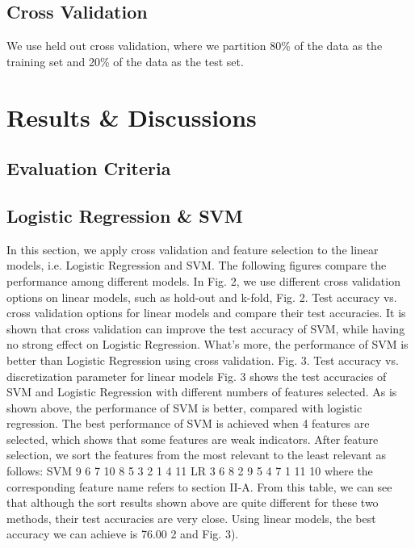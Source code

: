 \documentclass[conference]{IEEEtran}
\numberwithin{equation}{section}
\numberwithin{figure}{section}
\numberwithin{table}{section}
\begin{document}
\subsection{Cross Validation}
We use held out cross validation, where we partition 80\% of the data as the training set and 20\% of the data as the test set. 

\section{Results \& Discussions}
\subsection{Evaluation Criteria}



\subsection{Logistic Regression \& SVM}
In this section, we apply cross validation and
feature selection to the linear models, i.e. Logistic
Regression and SVM. The following figures compare
the performance among different models.
In Fig. 2, we use different cross validation options
on linear models, such as hold-out and k-fold,
Fig. 2. Test accuracy vs. cross validation options for linear models
and compare their test accuracies. It is shown that
cross validation can improve the test accuracy of
SVM, while having no strong effect on Logistic
Regression. What’s more, the performance of SVM
is better than Logistic Regression using cross validation.
Fig. 3. Test accuracy vs. discretization parameter for linear models
Fig. 3 shows the test accuracies of SVM and Logistic
Regression with different numbers of features
selected. As is shown above, the performance of
SVM is better, compared with logistic regression.
The best performance of SVM is achieved when
4 features are selected, which shows that some
features are weak indicators. After feature selection,
we sort the features from the most relevant to the
least relevant as follows:
SVM 9 6 7 10 8 5 3 2 1 4 11
LR 3 6 8 2 9 5 4 7 1 11 10
where the corresponding feature name refers to section
II-A. From this table, we can see that although
the sort results shown above are quite different for
these two methods, their test accuracies are very
close. Using linear models, the best accuracy we
can achieve is 76.00%
2 and Fig. 3).
\end{document}
